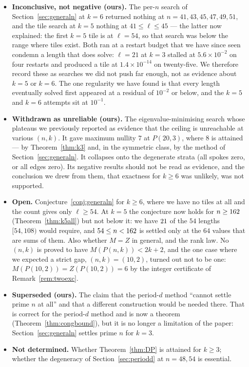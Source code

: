 \documentclass[11pt]{article}
\theoremstyle{definition}
\begin{document}
\begin{itemize}
\item \textbf{Inconclusive, not negative (ours).} The per-$n$ search of
Section~\ref{sec:generaln} at $k=6$ returned nothing at
$n=41,43,45,47,49,51$, and the tile search at $k=5$ nothing at
$41\le\ell\le45$ --- the latter now explained: the first $k=5$ tile is at
$\ell=54$, so that search was below the range where tiles exist. Both ran at a
restart budget that we have since seen condemn
a length that does solve: $\ell=21$ at $k=3$ stalled at $5.6\times10^{-2}$ on
four restarts and produced a tile at $1.4\times10^{-14}$ on twenty-five. We
therefore record these as searches we did not push far enough, not as evidence
about $k=5$ or $k=6$. The one regularity we have found is that every length
eventually solved first appeared at a residual of $10^{-2}$ or below, and the
$k=5$ and $k=6$ attempts sit at $10^{-1}$.

\item \textbf{Withdrawn as unreliable (ours).} The eigenvalue-minimising search
whose plateaus we previously reported as evidence that the ceiling is
unreachable at various $(n,k)$. It gave maximum nullity $7$ at $P(20,3)$, where
$8$ is attained --- by Theorem~\ref{thm:k3} and, in the symmetric class, by the
method of Section~\ref{sec:generaln}. It collapses onto the degenerate strata
(all spokes zero, or all edges zero). Its negative results should not be read as
evidence, and the conclusion we drew from them, that exactness for $k\ge6$ was
unlikely, was not supported.

\item \textbf{Open.} Conjecture~\ref{conj:generaln} for $k\ge6$, where we have
no tiles at all and the count gives only $\ell\ge54$. At $k=5$ the conjecture now
holds for $n\ge162$ (Theorem~\ref{thm:k5all}) but not below it: we have
$21$ of the $54$ lengths $[54,108)$ would require, and $54\le n<162$
is settled only at the $64$ values that are sums of them. Also whether
$M=Z$ in general, and the rank law. No $(n,k)$ is proved to have
$M(P(n,k))<2k+2$, and the one case where we expected a strict gap,
$(n,k)=(10,2)$, turned out not to be one: $M(P(10,2))=Z(P(10,2))=6$ by the
integer certificate of Remark~\ref{rem:twoexc}.

\item \textbf{Superseded (ours).} The claim that the period-$d$ method ``cannot
settle prime $n$ at all'' and that a different construction would be needed
there. That is correct for the period-$d$ method and is now a theorem
(Theorem~\ref{thm:congbound}), but it is no longer a limitation of the paper:
Section~\ref{sec:generaln} settles prime $n$ for $k=3$.

\item \textbf{Not determined.} Whether Theorem~\ref{thm:DP} is attained for
$k\ge3$; whether the degeneracy of Section~\ref{sec:periodd} at $n=48,54$ is
essential.
\end{itemize}
\end{document}
